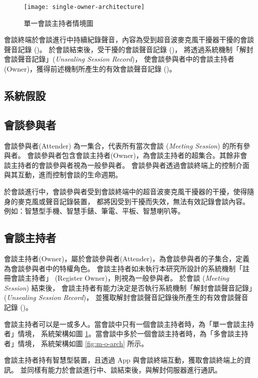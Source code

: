 \begin{figure}[H]
    \centering
    \texttt{[image: single-owner-architecture]}
    \caption{單一會談主持者情境圖}\label{fig:s-o-arch}
\end{figure}

    會談終端於會談進行中持續紀錄聲音，內容為受到超音波麥克風干擾器干擾的會談聲音記錄 (\DEFrecJ)。
於會談結束後，受干擾的會談聲音記錄 (\DEFrecJ)，
將透過系統機制「解封會談聲音記錄」({\it Unsealing Session Record})，
使會談參與者中的會談主持者(Owner)，獲得前述機制所產生的有效會談聲音記錄 (\DEFrecREV)。


\subsection{系統假設}


\subsection{會談參與者}

    會談參與者(Attender) 為一集合，代表所有當次會談 ({\it Meeting Session}) 的所有參與者。
會談參與者包含會談主持者(Owner)，為會談主持者的超集合。其餘非會談主持者的會談參與者視為一般參與者。
會談參與者透過會談終端上的控制介面與其互動，進而控制會談的生命週期。

    於會談進行中，會談參與者受到會談終端中的超音波麥克風干擾器的干擾，使得隨身的麥克風或聲音記錄裝置，
都將因受到干擾而失效，無法有效記錄會談內容。例如：智慧型手機、智慧手錶、筆電、平板、智慧喇叭等。


\subsection{會談主持者}

    會談主持者(Owner)，屬於會談參與者(Attender)，為會談參與者的子集合，定義為會談參與者中的特權角色。
會談主持者如未執行本研究所設計的系統機制「註冊會談主持者」 (Register Owner)，則視為一般參與者。
於會談 ({\it Meeting Session}) 結束後，
會談主持者有能力決定是否執行系統機制「解封會談聲音記錄」({\it Unsealing Session Record})，
並獲取解封會談聲音記錄後所產生的有效會談聲音記錄 (\DEFrecREV)。

    會談主持者可以是一或多人。當會談中只有一個會談主持者時，為「單一會談主持者」情境，
系統架構如圖 \ref{fig:s-o-arch}。當會談中多於一個會談主持者時，為「多會談主持者」情境，
系統架構如圖 \ref{fig:m-o-arch} 所示。

    會談主持者持有智慧型裝置，且透過 App 與會談終端互動，獲取會談終端上的資訊。
並同樣有能力於會談進行中、談結束後，與解封伺服器進行通訊。

